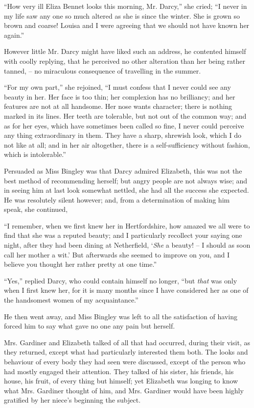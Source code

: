 “How very ill Eliza Bennet looks this morning, Mr.
Darcy,” she cried; “I never in my life saw any one so
much altered as she is since the winter. She is grown
so brown and coarse! Louisa and I were agreeing that
we should not have known her again.”

However little Mr. Darcy might have liked such an
address, he contented himself with coolly replying, that
he perceived no other alteration than her being rather
tanned, -- no miraculous consequence of travelling in the
summer.

“For my own part,” she rejoined, “I must confess that
I never could see any beauty in her. Her face is too thin;
her complexion has no brilliancy; and her features are
not at all handsome. Her nose wants character; there is
nothing marked in its lines. Her teeth are tolerable, but
not out of the common way; and as for her eyes, which
have sometimes been called so fine, I never could perceive
any thing extraordinary in them. They have a sharp,
shrewish look, which I do not like at all; and in her
air altogether, there is a self-sufficiency without fashion,
which is intolerable.”

Persuaded as Miss Bingley was that Darcy admired
Elizabeth, this was not the best method of recommending
herself; but angry people are not always wise; and in
seeing him at last look somewhat nettled, she had all
the success she expected. He was resolutely silent however;
and, from a determination of making him speak,
she continued,

“I remember, when we first knew her in Hertfordshire,
how amazed we all were to find that she was a reputed
beauty; and I particularly recollect your saying one
night, after they had been dining at Netherfield, ‘\textit{She}
a beauty! -- I should as soon call her mother a wit.’ But
afterwards she seemed to improve on you, and I believe
you thought her rather pretty at one time.”

“Yes,” replied Darcy, who could contain himself no
longer, “but \textit{that} was only when I first knew her, for it is
many months since I have considered her as one of the
handsomest women of my acquaintance.”

He then went away, and Miss Bingley was left to all
the satisfaction of having forced him to say what gave
no one any pain but herself.

Mrs. Gardiner and Elizabeth talked of all that had
occurred, during their visit, as they returned, except what
had particularly interested them both. The looks and
behaviour of every body they had seen were discussed,
except of the person who had mostly engaged their attention.
They talked of his sister, his friends, his house, his
fruit, of every thing but himself; yet Elizabeth was
longing to know what Mrs. Gardiner thought of him,
and Mrs. Gardiner would have been highly gratified by
her niece’s beginning the subject.


